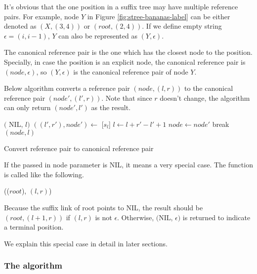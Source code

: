 \documentclass{article}
\begin{document}
It's obvious that the one position in a suffix tree may have multiple reference pairs.
For example, node $Y$ in Figure \ref{fig:stree-bananas-label} can be either
denoted as $(X, (3, 4))$ or $(root, (2, 4))$. If we define empty string
$\epsilon=(i, i-1)$, $Y$ can also be represented as $(Y, \epsilon)$.

The canonical reference pair is the one which has the closest node
to the position. Specially, in case the position is an
explicit node, the canonical reference pair is $(node, \epsilon)$, so $(Y, \epsilon)$
is the canonical reference pair of node $Y$.

Below algorithm converts a reference pair $(node, (l, r))$
to the canonical reference pair $(node', (l', r))$.
Note that since $r$ doesn't change, the algorithm can only return
$(node', l')$ as the result.

\begin{algorithm}
\begin{algorithmic}[1]
      \State \Return $($ NIL, $l)$
    \Else
      \State \Return {}
    \EndIf
  \EndIf
   
    \State $((l', r'), node') \gets$ [$s_l$]
      \State $l \gets l + r' - l' + 1$ 
      \State $node \gets node'$
    \Else
      \State break
    \EndIf
  \EndWhile
  \State \Return $(node, l)$
\EndFunction
\end{algorithmic}
\caption{Convert reference pair to canonical reference pair}
\label{algo:canon}
\end{algorithm}

If the passed in node parameter is NIL, it means a very special case.
The function is called like the following.

(($root$), $(l, r)$)

Because the suffix link of root points to NIL, the result should be
$(root, (l+1, r))$ if $(l, r)$ is not $\epsilon$. Otherwise,
$($NIL, $\epsilon)$ is returned to indicate a terminal position.

We explain this special case in detail in later sections.

\subsubsection{The algorithm}
\end{document}
